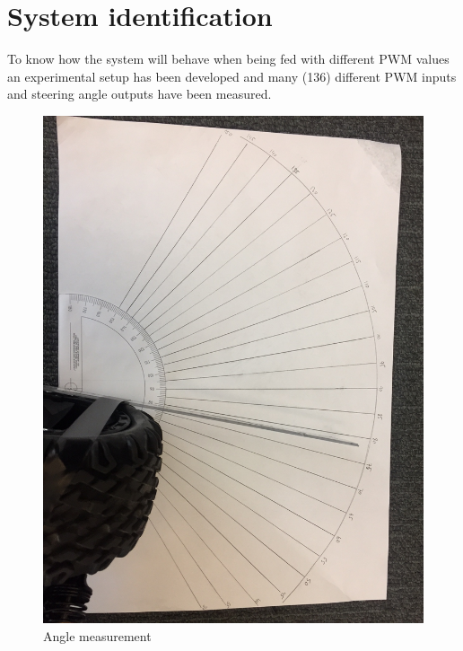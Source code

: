 


\section{System identification}
To know how the system will behave when being fed with different PWM values an experimental setup has been developed and many (136) different PWM inputs and steering angle outputs have been measured.


\begin{figure}[H]
  \includegraphics[width=\textwidth]{./img/anglepic.JPG}
  \centering
  \caption{Angle measurement}
  \label{fig:Angle measurement}
\end{figure}


